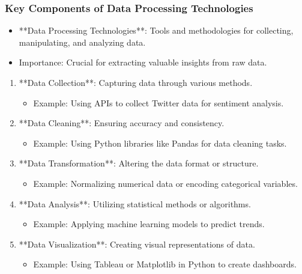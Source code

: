 \documentclass{beamer}
\begin{document}
\begin{frame}[fragile]
    \frametitle{Key Components of Data Processing Technologies}
    \begin{itemize}
        \item **Data Processing Technologies**: Tools and methodologies for collecting, manipulating, and analyzing data.
        \item Importance: Crucial for extracting valuable insights from raw data.
    \end{itemize}
    
    \begin{enumerate}
        \item **Data Collection**: Capturing data through various methods.
            \begin{itemize}
                \item Example: Using APIs to collect Twitter data for sentiment analysis.
            \end{itemize}
        
        \item **Data Cleaning**: Ensuring accuracy and consistency.
            \begin{itemize}
                \item Example: Using Python libraries like Pandas for data cleaning tasks.
            \end{itemize}
        
        \item **Data Transformation**: Altering the data format or structure.
            \begin{itemize}
                \item Example: Normalizing numerical data or encoding categorical variables.
            \end{itemize}
        
        \item **Data Analysis**: Utilizing statistical methods or algorithms.
            \begin{itemize}
                \item Example: Applying machine learning models to predict trends.
            \end{itemize}
        
        \item **Data Visualization**: Creating visual representations of data.
            \begin{itemize}
                \item Example: Using Tableau or Matplotlib in Python to create dashboards.
            \end{itemize}
    \end{enumerate}
\end{frame}
\end{document}
